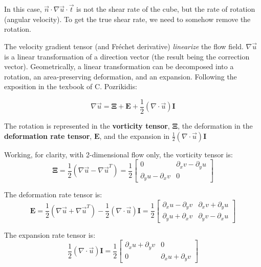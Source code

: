 \documentclass[a4paper]{report}
\begin{document}
In this case, $ \vec{n} \cdot \nabla \vec{u} \cdot \vec{t}$ is not the shear rate of the cube, but the rate of rotation (angular velocity).  To get the true shear rate, we need to somehow remove the rotation.

The velocity gradient tensor (and Fr\'{e}chet derivative) \emph{linearize} the flow field. $\nabla \vec{u}$ is a linear transformation of a direction vector (the result being the correction vector).  Geometrically, a linear transformation can be decomposed into a rotation, an area-preserving deformation, and an expansion.  Following the exposition in the texbook of C. Pozrikidis:

\begin{equation}
\nabla \vec{u} = \mathbf{\Xi} + \mathbf{E} + \frac{1}{2} (\nabla \cdot \vec{u})  \mathbf{I}
\end{equation}

The rotation is represented in the \textbf{vorticity tensor}, $\mathbf{\Xi}$, the deformation in the \textbf{deformation rate tensor}, $\mathbf{E}$, and the expansion in $ \frac{1}{2} (\nabla \cdot \vec{u}) \mathbf{I}$

Working, for clarity, with 2-dimensional flow only, the vorticity tensor is:
\begin{equation}
\mathbf{\Xi} = \frac{1}{2}(\nabla \vec{u} - \nabla \vec{u}^T) = 
\frac{1}{2}
\begin{bmatrix}
0  & \partial_x v - \partial_y u \\
\partial_y u - \partial_x v  & 0
\end{bmatrix}
\end{equation}

The deformation rate tensor is:
\begin{equation}
\mathbf{E} = \frac{1}{2}(\nabla \vec{u} + \nabla \vec{u}^T) - \frac{1}{2}(\nabla \cdot \vec{u}) \mathbf{I} = 
\frac{1}{2} 
\begin{bmatrix}
\partial_x u - \partial_y v  & \partial_x v + \partial_y u  \\
\partial_y u + \partial_x v  & \partial_y v - \partial_x u
\end{bmatrix}
\end{equation}

The expansion rate tensor is:
\begin{equation}
\frac{1}{2}(\nabla \cdot \vec{u}) \mathbf{I} =
\frac{1}{2}
\begin{bmatrix}
\partial_x u + \partial_y v  &  0  \\
0  &  \partial_x u + \partial_y v
\end{bmatrix}
\end{equation}
\end{document}
